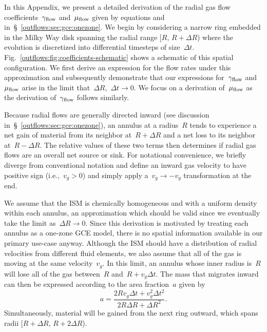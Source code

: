 \documentclass[main.tex]{subfiles}
\begin{document}
In this Appendix, we present a detailed derivation of the radial gas flow
coefficients~$\gamma_{\text{flow}}$ and~$\mu_{\text{flow}}$ given by equations
 and~
in~\S~\ref{outflows:sec:gce:onezone}.
We begin by considering a narrow ring embedded in the Milky Way disk spanning
the radial range [$R$, $R + \Delta R$) where the evolution is discretized into
differential timesteps of size~$\Delta t$.
Fig.~\ref{outflows:fig:coefficients-schematic} shows a schematic of this
spatial configuration.
We first derive an expression for the flow rates under this approximation and
subsequently demonstrate that our expressions for~$\gamma_{\text{flow}}$
and~$\mu_{\text{flow}}$ arise in the limit that~$\Delta R$,~$\Delta t \rightarrow 0$.
We focus on a derivation of~$\mu_{\text{flow}}$ as the derivation of~$\gamma_{\text{flow}}$
follows similarly.
\par
Because radial flows are generally directed inward (see discussion
in~\S~\ref{outflows:sec:gce:onezone}), an annulus at a radius~$R$ tends to
experience a net gain of material from its neighbor at~$R + \Delta R$ and a net
loss to its neighbor at~$R - \Delta R$.
The relative values of these two terms then determines if radial gas flows are
an overall net source or sink.
For notational convenience, we briefly diverge from conventional notation and
define an inward gas velocity to have positive sign (i.e.,~$v_g > 0$) and
simply apply a~$v_g \rightarrow -v_g$ transformation at the end.
\par
We assume that the ISM is chemically homogeneous and with a uniform density
within each annulus, an approximation which should be valid since we eventually
take the limit as~$\Delta R \rightarrow 0$.
Since this derivation is motivated by treating each annulus as a one-zone GCE
model, there is no spatial information available in our primary use-case anyway.
Although the ISM should have a distribution of radial velocities from different
fluid elements, we also assume that all of the gas is moving at the same
velocity~$v_g$.
In this limit, an annulus whose inner radius is~$R$ will lose all of the gas
between~$R$ and~$R + v_g \Delta t$.
The mass that migrates inward can then be expressed according to the area
fraction~$a$ given by
\begin{equation}
a = \frac{
	2 R v_g \Delta t + v_g^2 \Delta t^2
}{
	2 R \Delta R + \Delta R^2
}.
\label{outflows:eq:area-frac-def}
\end{equation}
Simultaneously, material will be gained from the next ring outward, which spans
radii [$R + \Delta R$, $R + 2\Delta R$).
\end{document}
